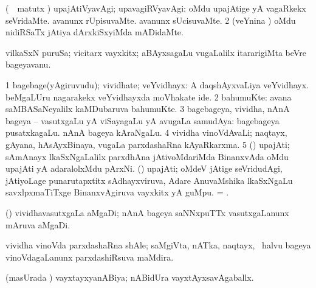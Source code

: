 \bentry
{} 
\gl{\kirxvi}
\expl{}
\bmng
\bnum
{} (\kanmu\ \savi\ matutx \pArxvi) upajAtiVyavAgi; upavagiRVyavAgi: 
\banum
{} oMdu upajAtige yA vagaRkekx seVridaMte. 
 avanunx rUpisuvaMte. 
 avanunx sUcisuvaMte. 
\eanum
\numie
\num{2} (veYnina \vi) oMdu nidiRSaTx jAtiya dArxkiSxyiMda mADidaMte. 
\enum
\emng
\eentry

\bentry
{} 
\gl{\nA}
\expl{}
\bmng
 vilkaSxN puruSa; vicitarx vayxkitx; aBAyxsagaLu \mo vugaLalilx itararigiMta beVre bageyavanu. 
\emng
\eentry

\bentry
{} 
\gl{\nA}
\bmng
\bnum
\num{1} bagebage(yAgiruvudu); vividhate; veYvidhayx:   A daqshAyxvaLiya veYvidhayx.  beMgaLUru nagarakekx veYvidhayxda moVhakate ide. 
\num{2} bahumuKte:  avana saMBASaNeyalilx kaMDubaruva bahumuKte. 
\num{3} bagebageya, vividha, nAnA bageya -- vasutxgaLu yA viSayagaLu yA avugaLa samudAya:  bagebageya pusatxkagaLu.  nAnA bageya kAraNgaLu. 
\hypertarget{variety(4)}{} 
\num{4} vividha vinoVdAvaLi; naqtayx, gAyana, hAsAyxBinaya, \mo vugaLa parxdashaRna kAyaRkarxma. 
\num{5} (\jiVvi) upajAti; sAmAnayx lkaSxNgaLalilx parxdhAna jAtivoMdariMda BinanxvAda oMdu upajAti yA adaralolxMdu pArxNi. 
 (\jiVvi) 
\banum
{} upajAti; oMdeV jAtige seVridudAgi, jAtiyoLage punarutapxtitx sAdhayxviruva, Adare AnuvaMshika lkaSxNgaLu savxlpxmaTiTxge BinanxvAgiruva vayxkitx yA guMpu. 
 = . 
\eanum
\numie
\enum
\emng
\eentry

\bentry
{}
\gl{\nA}
\expl{}
\bmng
\emng
\eentry

\bentry
{}
\gl{\nA}
\expl{}
\bmng
 (\ame) vividhavasutxgaLa aMgaDi; nAnA bageya saNNxpuTTx vasutxgaLanunx mAruva aMgaDi. 
\emng
\eentry

\bentry
{}
\gl{\nA}
\expl{}
\bmng
 vividha vinoVda parxdashaRna shAle; saMgiVta, nATka, naqtayx, \mo\ halvu bageya vinoVdagaLanunx parxdashiRsuva maMdira. 
\emng
\eentry

\bentry
{} 
\gl{\gu}
\expl{}
\bmng
 (masUrada \vi) vayxtayxyanABiya; nABidUra vayxtAyxsavAgaballx. 
\emng
\eentry

